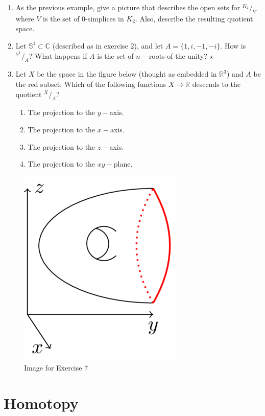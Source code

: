 \documentclass[
	fontsize=10pt, %
	twoside=false, %
	secnumdepth=1, %
]{kaobook}
\begin{document}
\begin{enumerate}
\item As the previous example, give a picture that describes the open sets for ${}^{K_2}\!/_{V}$ where $V$ is the set of 0-simplices in $K_2.$ Also, describe the resulting quotient space.

\item Let $\mathbb{S}^1\subset \mathbb{C}$ (described as in exercise 2), and let $A=\{1,i,-1,-i\}.$ How is ${}^{\mathbb{S}^1}\!/_{A}$? What happens if $A$ is the set of $n-$roots of the unity? $\star$

\item Let $X$ be the space in the figure below (thought as embedded in $\mathbb{R}^3$) and $A$ be the red subset. Which of the following functions $X\to \mathbb{R}$ descends to the quotient ${}^X\!/_A$?
\begin{enumerate}
\item The projection to the $y-$axis.
\item The projection to the $x-$axis.
\item The projection to the $z-$axis.
\item The projection to the $xy-$plane.
\end{enumerate}
\end{enumerate}

\begin{figure}[h]
\includegraphics[scale=0.05]{DescendMaps.png}
\caption{Image for Exercise 7}
\end{figure}

\section{Homotopy}
\end{document}
